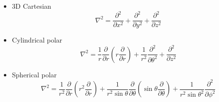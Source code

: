 \begin{itemize}
\item 3D Cartesian \[\nabla^2 = \frac{\partial^2}{\partial x^2} + \frac{\partial^2}{\partial y^2} + \frac{\partial^2}{\partial z^2} \]
\item Cylindrical polar \[\nabla^2 = \frac{1}{r}\frac{\partial}{\partial r}\left(r\frac{\partial}{\partial r}\right) + \frac{1}{r^2}\frac{\partial^2}{\partial \theta^2} + \frac{\partial^2}{\partial z^2} \]
\item Spherical polar \[ \nabla^2 = \frac{1}{r^2}\frac{\partial}{\partial r}\left(r^2\frac{\partial}{\partial r}\right) + \frac{1}{r^2 \sin{\theta}} \frac{\partial}{\partial \theta} \left(\sin{\theta}\frac{\partial}{\partial\theta}\right) + \frac{1}{r^2 \sin{\theta}^2} \frac{\partial^2}{\partial \phi^2} \]
\end{itemize}

